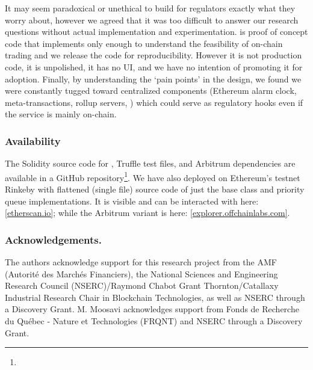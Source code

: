 It may seem paradoxical or unethical to build for regulators exactly what they worry about, however we agreed that it was too difficult to answer our research questions without actual implementation and experimentation. \cm is proof of concept code that implements only enough to understand the feasibility of on-chain trading and we release the code for reproducibility. However it is not production code, it is unpolished, it has no UI, and we have no intention of promoting it for adoption. Finally, by understanding the `pain points' in the design, we found we were constantly tugged toward centralized components (Ethereum alarm clock, meta-transactions, rollup servers, \etc) which could serve as regulatory hooks even if the service is mainly on-chain.
 
 \subsubsection*{Availability} 
The Solidity source code for \cm, Truffle test files, and Arbitrum dependencies are available in a GitHub repository\footnote{\CallMarketRepo}. We have also deployed \cm on Ethereum's testnet Rinkeby with flattened (single file) source code of just the \cm base class and priority queue implementations. It is visible and can be interacted with here: \href{https://rinkeby.etherscan.io/address/0x0d91de29c531d074853a5cef7cf9dfeb9c6ec4e0}{[etherscan.io]}; while the Arbitrum variant is here: \href{https://explorer.arbitrum.io/#/tx/0x1828d7eb6a7a9b9ec479f07e8149c6172bb89a101571963b5cf690132bdf009b}{[explorer.offchainlabs.com]}.
 
 
\subsubsection*{Acknowledgements.}  The authors acknowledge support for this research project from the AMF (Autorité des Marchés Financiers), the National Sciences and Engineering Research Council (NSERC)/Raymond Chabot Grant Thornton/Catallaxy Industrial Research Chair in Blockchain Technologies, as well as NSERC through a Discovery Grant. M. Moosavi acknowledges support from Fonds de Recherche du Québec - Nature et Technologies (FRQNT) and NSERC through a Discovery Grant.




























